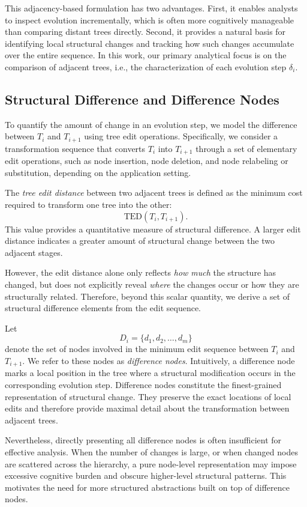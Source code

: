 This adjacency-based formulation has two advantages. First, it enables analysts to inspect evolution incrementally, which is often more cognitively manageable than comparing distant trees directly. Second, it provides a natural basis for identifying local structural changes and tracking how such changes accumulate over the entire sequence. In this work, our primary analytical focus is on the comparison of adjacent trees, i.e., the characterization of each evolution step $\delta_i$.

\subsection{Structural Difference and Difference Nodes}

To quantify the amount of change in an evolution step, we model the difference between $T_i$ and $T_{i+1}$ using tree edit operations. Specifically, we consider a transformation sequence that converts $T_i$ into $T_{i+1}$ through a set of elementary edit operations, such as node insertion, node deletion, and node relabeling or substitution, depending on the application setting.

The \emph{tree edit distance} between two adjacent trees is defined as the minimum cost required to transform one tree into the other:
\[
\mathrm{TED}(T_i, T_{i+1}).
\]
This value provides a quantitative measure of structural difference. A larger edit distance indicates a greater amount of structural change between the two adjacent stages.

However, the edit distance alone only reflects \emph{how much} the structure has changed, but does not explicitly reveal \emph{where} the changes occur or how they are structurally related. Therefore, beyond this scalar quantity, we derive a set of structural difference elements from the edit sequence.

Let
\[
D_i = \{d_1, d_2, \dots, d_m\}
\]
denote the set of nodes involved in the minimum edit sequence between $T_i$ and $T_{i+1}$. We refer to these nodes as \emph{difference nodes}. Intuitively, a difference node marks a local position in the tree where a structural modification occurs in the corresponding evolution step. Difference nodes constitute the finest-grained representation of structural change. They preserve the exact locations of local edits and therefore provide maximal detail about the transformation between adjacent trees.

Nevertheless, directly presenting all difference nodes is often insufficient for effective analysis. When the number of changes is large, or when changed nodes are scattered across the hierarchy, a pure node-level representation may impose excessive cognitive burden and obscure higher-level structural patterns. This motivates the need for more structured abstractions built on top of difference nodes.

